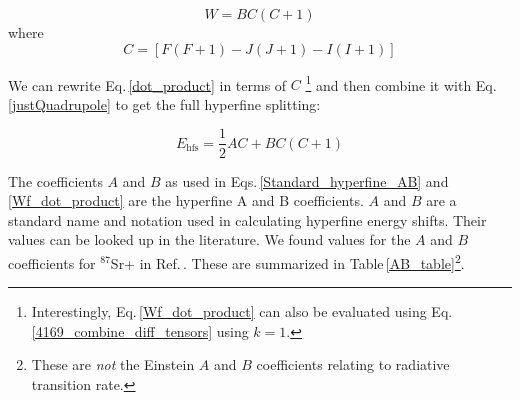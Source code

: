 
\begin{equation}\label{justQuadrupole}
W=BC(C+1)
\end{equation}
where 
\begin{equation}
C=[F(F+1)-J(J+1)-I(I+1)]
\end{equation}

We can rewrite Eq.\,\ref{dot_product} in terms of $C$ \footnote{Interestingly, Eq.\,\ref{Wf_dot_product} can also be evaluated using Eq.\,\ref{4169_combine_diff_tensors} using $k=1$.}
and then combine it with Eq.\,\ref{justQuadrupole} to get the full hyperfine splitting\cite{cuaMITnotes}: 

\begin{equation}\label{Standard_hyperfine_AB}
E_{\mathrm{hfs}}=\frac{1}{2}AC+BC(C+1)
\end{equation}

The coefficients $A$ and $B$ as used in Eqs.\,\ref{Standard_hyperfine_AB} and \ref{Wf_dot_product} are the hyperfine A and B coefficients. $A$ and $B$ are a standard name and notation used in calculating hyperfine energy shifts. Their values can be looked up in the literature\cite{cuaMITnotes}.  We found values for the $A$ and $B$ coefficients for $^{87}$Sr+ in Ref.\,\cite{safronova2photon}. These are summarized in Table\,\ref{AB_table}\footnote{These are \emph{not} the Einstein $A$ and $B$ coefficients relating to radiative transition rate.}.  

